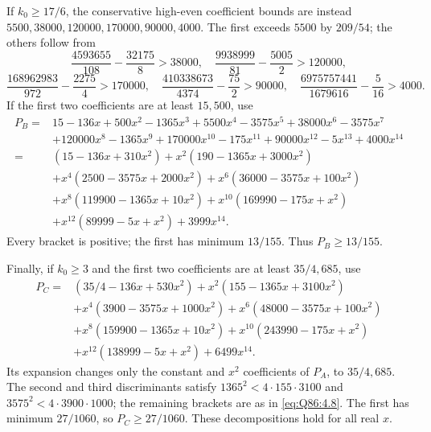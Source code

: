 If \(k_0\ge\allowbreak 17/6\), the conservative high-even coefficient bounds are instead
\(5500,\allowbreak 38000,\allowbreak 120000,\allowbreak 170000,\allowbreak 90000,\allowbreak 4000\).
The first exceeds \(5500\) by \(209/54\); the others follow from
\[
\frac{4593655}{108}-\frac{32175}{8}>38000,\quad
\frac{9938999}{81}-\frac{5005}{2}>120000,
\]
\[
\frac{168962983}{972}-\frac{2275}{4}>170000,\quad
\frac{410338673}{4374}-\frac{75}{2}>90000,\quad
\frac{6975757441}{1679616}-\frac5{16}>4000.
\]
If the first two coefficients are at least \(15,\allowbreak 500\), use
\[
\begin{split}
P_B={}&15-136x+500x^2-1365x^3+5500x^4-3575x^5
 +38000x^6-3575x^7\\
&+120000x^8-1365x^9+170000x^{10}-175x^{11}
 +90000x^{12}-5x^{13}+4000x^{14}\\
={}&(15-136x+310x^2)+x^2(190-1365x+3000x^2)\\
&+x^4(2500-3575x+2000x^2)+x^6(36000-3575x+100x^2)\\
&+x^8(119900-1365x+10x^2)+x^{10}(169990-175x+x^2)\\
&+x^{12}(89999-5x+x^2)+3999x^{14}.
\end{split}
\tag{Q86.4.9}\label{eq:Q86:4.9}
\]
Every bracket is positive; the first has minimum \(13/155\).
Thus \(P_B\ge\allowbreak 13/155\).

Finally, if \(k_0\ge\allowbreak 3\) and the first two coefficients are at least \(35/4,\allowbreak 685\), use
\[
\begin{split}
P_C={}&(35/4-136x+530x^2)+x^2(155-1365x+3100x^2)\\
&+x^4(3900-3575x+1000x^2)+x^6(48000-3575x+100x^2)\\
&+x^8(159900-1365x+10x^2)+x^{10}(243990-175x+x^2)\\
&+x^{12}(138999-5x+x^2)+6499x^{14}.
\end{split}
\tag{Q86.4.10}\label{eq:Q86:4.10}
\]
Its expansion changes only the constant and \(x^2\) coefficients of \(P_A\), to \(35/4,\allowbreak 685\).
The second and third discriminants satisfy
\(1365^2<\allowbreak 4\cdot155\cdot3100\) and
\(3575^2<\allowbreak 4\cdot3900\cdot1000\); the remaining brackets are as in
\eqref{eq:Q86:4.8}.
The first has minimum \(27/1060\), so \(P_C\ge\allowbreak 27/1060\).
These decompositions hold for all real \(x\).

